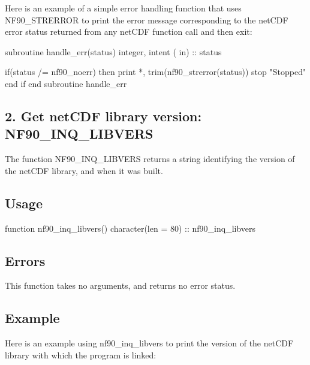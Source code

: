 Here is an example of a simple error handling function that uses N\+F90\+\_\+\+S\+T\+R\+E\+R\+R\+OR to print the error message corresponding to the net\+C\+DF error status returned from any net\+C\+DF function call and then exit\+:


\begin{DoxyCode}
\textcolor{keyword}{subroutine }handle\_err(status)
  \textcolor{keywordtype}{integer}, \textcolor{keywordtype}{intent ( in)} :: status

  \textcolor{keywordflow}{if}(status /= nf90\_noerr) \textcolor{keywordflow}{then}
    print *, trim(nf90\_strerror(status))
    stop \textcolor{stringliteral}{"Stopped"}
\textcolor{keywordflow}{  end if}
\textcolor{keyword}{end subroutine }handle\_err
\end{DoxyCode}
\hypertarget{f90_datasets_f90-get-netcdf-library-version-nf90_inq_libvers}{}\subsection{2. Get net\+C\+D\+F library version\+: N\+F90\+\_\+\+I\+N\+Q\+\_\+\+L\+I\+B\+V\+E\+R\+S }\label{f90_datasets_f90-get-netcdf-library-version-nf90_inq_libvers}
The function N\+F90\+\_\+\+I\+N\+Q\+\_\+\+L\+I\+B\+V\+E\+RS returns a string identifying the version of the net\+C\+DF library, and when it was built.

\subsection*{Usage}


\begin{DoxyCode}
\textcolor{keyword}{function }nf90\_inq\_libvers()
  \textcolor{keywordtype}{character(len = 80)} :: nf90\_inq\_libvers
\end{DoxyCode}


\subsection*{Errors}

This function takes no arguments, and returns no error status.

\subsection*{Example}

Here is an example using nf90\+\_\+inq\+\_\+libvers to print the version of the net\+C\+DF library with which the program is linked\+:



